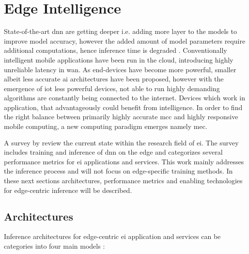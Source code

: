 \section{Edge Intelligence}

State-of-the-art \gls{dnn} are getting deeper i.e. adding more layer to the models to improve model accuracy, however the added amount of model parameters require additional computations, hence inference time is degraded \cite{bibid}. Conventionally intelligent mobile applications have been run in the cloud, introducing highly unreliable latency in \gls{wan}. As end-devices have become more powerful, smaller albeit less accurate \gls{ai} architectures have been proposed, however with the emergence of \gls{iot} less powerful devices, not able to run highly demanding algorithms are constantly being connected to the internet. Devices which work in application, that advantageously could benefit from intelligence. In order to find the right balance between primarily highly accurate \gls{mcc} and highly responsive mobile computing, a new computing paradigm emerges namely \gls{mec}.  

A survey by \citet{zhou_edge_2019} review the current state within the research field of \gls{ei}. The survey includes training and inference of \gls{dnn} on the edge and categorizes several performance metrics for \gls{ei} applications and services. This work mainly addresses the inference process and will not focus on edge-specific training methods. In these next sections architectures, performance metrics and enabling technologies for edge-centric inference will be described.  

\subsection{Architectures}

Inference architectures for edge-centric \gls{ei} application and services can be categories into four main models \cite{zhou_edge_2019}:


